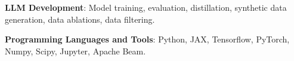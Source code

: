 
\textbf{LLM Development}: Model training, evaluation, distillation, synthetic data generation, data ablations, data filtering.

\textbf{Programming Languages and Tools}: Python, JAX, Tensorflow, PyTorch, Numpy, Scipy, Jupyter, Apache Beam.













